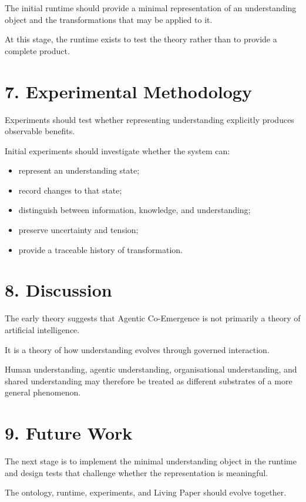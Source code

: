 The initial runtime should provide a minimal representation of an understanding object and the transformations that may be applied to it.

At this stage, the runtime exists to test the theory rather than to provide a complete product.

\section*{7. Experimental Methodology}

Experiments should test whether representing understanding explicitly produces observable benefits.

Initial experiments should investigate whether the system can:

\begin{itemize}
\item represent an understanding state;
\item record changes to that state;
\item distinguish between information, knowledge, and understanding;
\item preserve uncertainty and tension;
\item provide a traceable history of transformation.
\end{itemize}

\section*{8. Discussion}

The early theory suggests that Agentic Co-Emergence is not primarily a theory of artificial intelligence.

It is a theory of how understanding evolves through governed interaction.

Human understanding, agentic understanding, organisational understanding, and shared understanding may therefore be treated as different substrates of a more general phenomenon.

\section*{9. Future Work}

The next stage is to implement the minimal understanding object in the runtime and design tests that challenge whether the representation is meaningful.

The ontology, runtime, experiments, and Living Paper should evolve together.